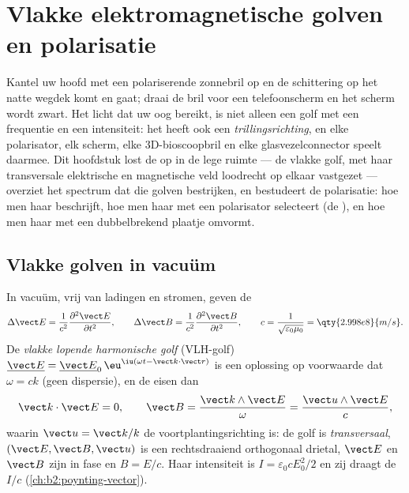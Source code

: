 \chapter{Vlakke elektromagnetische golven en
polarisatie}\label{ch:b2:plane-waves-polarization}

Kantel uw hoofd met een polariserende zonnebril op en de schittering op het
natte wegdek komt en gaat; draai de bril voor een telefoonscherm en het
scherm wordt zwart. Het licht dat uw oog bereikt, is niet alleen een golf
met een frequentie en een intensiteit: het heeft ook een
\emph{trillingsrichting}, en elke polarisator, elk scherm, elke
3D-bioscoopbril en elke glasvezelconnector speelt daarmee. Dit hoofdstuk
lost de  op in de lege ruimte --- de vlakke golf,
met haar transversale elektrische en magnetische veld loodrecht op elkaar
vastgezet --- overziet het spectrum dat die golven bestrijken, en bestudeert
de polarisatie: hoe men haar beschrijft, hoe men haar met een polarisator
selecteert (de ), en hoe men haar met een dubbelbrekend plaatje
omvormt.

\section{Vlakke golven in vacuüm}

\begin{theorem}\label{thm:b2:plane-waves-polarization:wave}
In vacuüm, vrij van ladingen en stromen, geven de 
\[
\Delta\vect E = \frac1{c^2}\frac{\partial^2\vect E}{\partial t^2} , \qquad
\Delta\vect B = \frac1{c^2}\frac{\partial^2\vect B}{\partial t^2} , \qquad
c = \frac1{\sqrt{\varepsilon_0\mu_0}} = \qty{2.998e8}{m/s} .
\]
De \emph{vlakke lopende harmonische golf} (VLH-golf)
$\underline{\vect E} =
\underline{\vect E}_0\,\eu^{\iu(\omega t - \vect k\cdot\vect r)}$
is een oplossing op voorwaarde dat $\omega = ck$ (geen dispersie), en de
 eisen dan
\[
\vect k\cdot\vect E = 0 , \qquad
\vect B = \frac{\vect k\wedge\vect E}\omega = \frac{\vect u\wedge\vect E}c ,
\]
waarin $\vect u = \vect k/k$ de voortplantingsrichting is: de golf is
\emph{transversaal}, $(\vect E, \vect B, \vect u)$ is een rechtsdraaiend
orthogonaal drietal, $\vect E$ en $\vect B$ zijn in fase en $B = E/c$. Haar
intensiteit is $I = \varepsilon_0cE_0^2/2$ en zij draagt de  $I/c$
(\cref{ch:b2:poynting-vector}).
\end{theorem}

